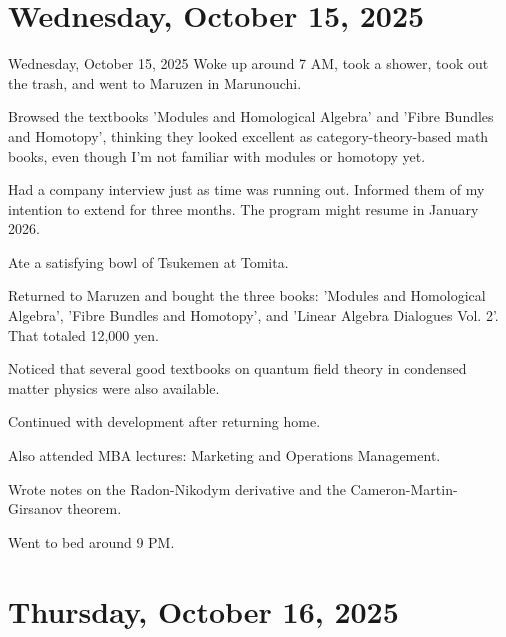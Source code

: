 \documentclass[dvipdfmx, autodetect-engine, aspectratio=169, 10.5pt]{beamer}
\begin{document}
\section{Wednesday, October 15, 2025}

\begin{frame}{Wednesday, October 15, 2025}
	\scriptsize
	Woke up around 7 AM, took a shower, took out the trash, and went to Maruzen in Marunouchi.

	Browsed the textbooks 'Modules and Homological Algebra' and 'Fibre Bundles and Homotopy', thinking they looked excellent as category-theory-based math books, even though I'm not familiar with modules or homotopy yet.

	Had a company interview just as time was running out.
	Informed them of my intention to extend for three months.
	The program might resume in January 2026.

	Ate a satisfying bowl of Tsukemen at Tomita.

	Returned to Maruzen and bought the three books: 'Modules and Homological Algebra', 'Fibre Bundles and Homotopy', and 'Linear Algebra Dialogues Vol. 2'.
	That totaled 12,000 yen.

	Noticed that several good textbooks on quantum field theory in condensed matter physics were also available.

	Continued with development after returning home.

	Also attended MBA lectures: Marketing and Operations Management.

	Wrote notes on the Radon-Nikodym derivative and the Cameron-Martin-Girsanov theorem.

	Went to bed around 9 PM.
\end{frame}

\section{Thursday, October 16, 2025}
\end{document}
